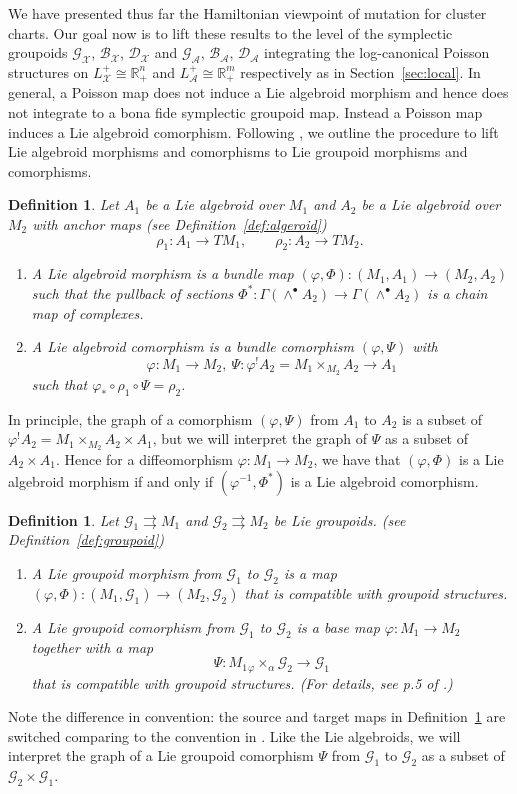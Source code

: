 \documentclass{amsart}
\newtheorem{definition}[theorem]{Definition}
\numberwithin{equation}{section}
\newcommand{\cA}{\mathcal{A}}
\newcommand{\cB}{\mathcal{B}}
\newcommand{\cD}{\mathcal{D}}
\newcommand{\cG}{\mathcal{G}}
\newcommand{\cX}{\mathcal{X}}
\newcommand{\RR}{\mathbb{R}}
\newcommand{\rra}{\rightrightarrows}
\begin{document}
We have presented thus far the Hamiltonian viewpoint of mutation for cluster charts. Our goal now is to lift these results to the level of the symplectic groupoids $\cG_\cX$, $\cB_\cX$, $\cD_\cX$ and $\cG_\cA$, $\cB_\cA$, $\cD_\cA$ integrating the log-canonical Poisson structures on $L^+_\cX\cong\RR_+^n$ and $L^+_\cA\cong\RR_+^m$ respectively as in Section~\ref{sec:local}. In general,
 a Poisson map does not induce a Lie algebroid morphism and hence does not integrate to a bona fide symplectic groupoid map. Instead a Poisson map induces a Lie algebroid comorphism. Following \cite{MR3089758}, we outline the procedure to lift Lie algebroid morphisms and comorphisms to Lie groupoid morphisms and comorphisms.
\begin{definition} \cite{Higgins1990, MR2157566, MR3089758}
 	Let $A_1$ be a Lie algebroid over $M_1$ and $A_2$ be a Lie algebroid over $M_2$ with anchor maps (see Definition~\ref{def:algeroid})
 	\[ \rho_1: A_1 \to TM_1, \qquad \rho_2: A_2 \to TM_2. \]
 	\begin{enumerate}
 		\item A Lie algebroid morphism is a bundle map $(\varphi, \Phi): (M_1, A_1) \to (M_2, A_2)$ such that the pullback of sections $\Phi^*: \Gamma(\wedge^\bullet A_2) \to \Gamma(\wedge^\bullet A_2)$ is a chain map of complexes.
 		\item A Lie algebroid comorphism is a bundle comorphism $(\varphi, \Psi)$ with
 			\[ \varphi: M_1 \to M_2,~ \Psi: \varphi^! A_2 = M_1 {\times_{M_2}} A_2 \to A_1 \]
 			such that $\varphi_* \circ \rho_1 \circ \Psi = \rho_2$. 
 	\end{enumerate}
\end{definition}
In principle, the graph of a comorphism $(\varphi, \Psi)$ from $A_1$ to $A_2$ is a subset of $\varphi^! A_2 = M_1 {\times_{M_2}} A_2 \times A_1$, but we will interpret the graph of $\Psi$ as a subset of $A_2 \times A_1$. Hence for a diffeomorphism $\varphi: M_1 \to M_2$, we have that $(\varphi, \Phi)$ is a Lie algebroid morphism if and only if $(\varphi^{-1}, \Phi^*)$ is a Lie algebroid comorphism.
\begin{definition} \cite{MR2157566, MR3089758} \label{def:gpdcomor}
	Let $\cG_1 \rra M_1$ and $\cG_2 \rra M_2$ be Lie groupoids. (see Definition~\ref{def:groupoid})
	\begin{enumerate}
 		\item A Lie groupoid morphism from $\cG_1$ to $\cG_2$ is a map $(\varphi, \Phi): (M_1, \cG_1) \to (M_2, \cG_2)$ that is compatible with groupoid structures. 
 		\item A Lie groupoid comorphism from $\cG_1$ to $\cG_2$ is a base map $\varphi: M_1 \to M_2$ together with a map
 			\[ \Psi: M_1 {_\varphi \times_\alpha} \cG_2 \to \cG_1 \]
 		that is compatible with groupoid structures. (For details, see p.5 of \cite{MR3089758}.) 
 	\end{enumerate}
\end{definition}
Note the difference in convention: the source and target maps in Definition~\ref{def:gpdcomor} are switched comparing to the convention in \cite{MR3089758}. Like the Lie algebroids, we will interpret the graph of a Lie groupoid comorphism $\Psi$ from $\cG_1$ to $\cG_2$ as a subset of $\cG_2 \times \cG_1$.
\end{document}
